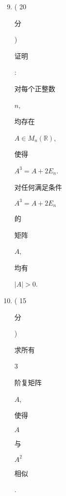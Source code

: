 \documentclass[10pt]{article}
\begin{document}
\begin{enumerate}
  \setcounter{enumi}{8}
  \item ( 20 \begin{CJK}{UTF8}{mj}分\end{CJK}) \begin{CJK}{UTF8}{mj}证明\end{CJK}: \begin{CJK}{UTF8}{mj}对每个正整数\end{CJK} $n$, \begin{CJK}{UTF8}{mj}均存在\end{CJK} $A \in M_{n}(\mathbb{R})$, \begin{CJK}{UTF8}{mj}使得\end{CJK} $A^{3}=A+2 E_{n}$. \begin{CJK}{UTF8}{mj}对任何满足条件\end{CJK} $A^{3}=A+2 E_{n}$ \begin{CJK}{UTF8}{mj}的\end{CJK} \begin{CJK}{UTF8}{mj}矩阵\end{CJK} $A$, \begin{CJK}{UTF8}{mj}均有\end{CJK} $|A|>0$.

  \item ( 15 \begin{CJK}{UTF8}{mj}分\end{CJK}) \begin{CJK}{UTF8}{mj}求所有\end{CJK} 3 \begin{CJK}{UTF8}{mj}阶复矩阵\end{CJK} $A$, \begin{CJK}{UTF8}{mj}使得\end{CJK} $A$ \begin{CJK}{UTF8}{mj}与\end{CJK} $A^{2}$ \begin{CJK}{UTF8}{mj}相似\end{CJK}.

\end{enumerate}
\end{document}

